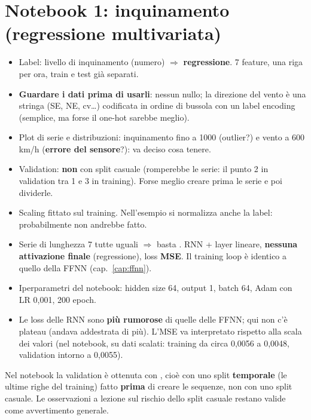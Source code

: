 \section{Notebook 1: inquinamento (regressione multivariata)}
\begin{itemize}
  \item Label: livello di inquinamento (numero) $\Rightarrow$ \textbf{regressione}. 7 feature, una riga per ora, train e test già separati.
  \item \textbf{Guardare i dati prima di usarli}: nessun nullo; la direzione del vento è una stringa (SE, NE, cv\ldots) codificata in
        ordine di bussola con un label encoding (semplice, ma forse il one-hot sarebbe meglio).
  \item Plot di serie e distribuzioni: inquinamento fino a 1000 (outlier?) e vento a 600 km/h (\textbf{errore del sensore}?): va deciso
        cosa tenere.
  \item Validation: \textbf{non} con split casuale (romperebbe le serie: il punto 2 in validation tra 1 e 3 in training). Forse meglio
        creare prima le serie e poi dividerle.
  \item Scaling fittato sul training. Nell'esempio si normalizza anche la label: probabilmente non andrebbe fatto.
  \item Serie di lunghezza 7 tutte uguali $\Rightarrow$ basta . RNN + layer lineare, \textbf{nessuna attivazione finale}
        (regressione), loss \textbf{MSE}. Il training loop è identico a quello della FFNN (cap.~\ref{cap:ffnn}).
  \item Iperparametri del notebook: hidden size 64, output 1, batch 64, Adam con LR 0,001, 200 epoch.
  \item Le loss delle RNN sono \textbf{più rumorose} di quelle delle FFNN; qui non c'è plateau (andava addestrata di più). L'MSE va
        interpretato rispetto alla scala dei valori (nel notebook, su dati scalati: training da circa 0,0056 a 0,0048, validation
        intorno a 0,0055).
\end{itemize}
\begin{verifica}
Nel notebook la validation è ottenuta con , cioè con uno split \textbf{temporale} (le ultime righe del
training) fatto \textbf{prima} di creare le sequenze, non con uno split casuale. Le osservazioni a lezione sul rischio dello split
casuale restano valide come avvertimento generale.
\end{verifica}

